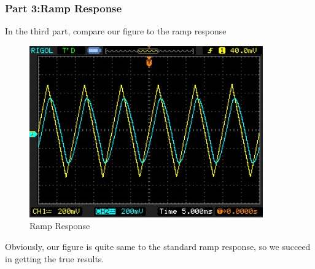 \documentclass[12pt]{article}
\begin{document}
\subsubsection{Part 3:Ramp Response}
In the third part, compare our figure to the ramp response 
\begin{figure}[H]
\centering
\includegraphics[scale=1]{p8.jpg}
\caption{Ramp Response}
\end{figure}
Obviously, our figure is quite same to the standard ramp response, so we succeed in getting the true results.
\end{document}
